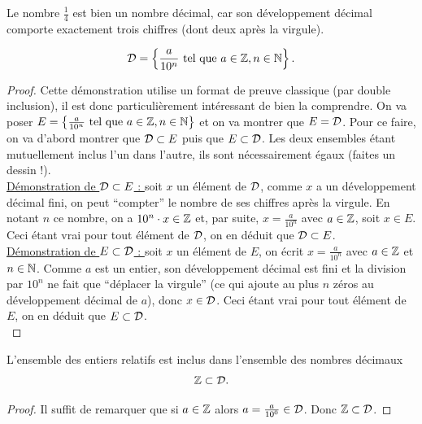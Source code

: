 \documentclass[a4paper, 12pt]{report}
\begin{document}
\begin{ex}
Le nombre $\frac{1}{4}$ est bien un nombre décimal, car son développement décimal comporte exactement trois chiffres (dont deux après la virgule).
\end{ex}

\begin{thm}
\[ \mathcal{D} = \left \{ \frac{a}{10^n} \text{ tel que } a \in \mathbb{Z}, n \in \mathbb{N} \right \} . \]
\end{thm}

\begin{proof}
Cette démonstration utilise un format de preuve classique (par double inclusion), il est donc particulièrement intéressant de bien la comprendre. On va poser $E = \left \{ \frac{a}{10^n} \text{ tel que } a \in \mathbb{Z}, n \in \mathbb{N} \right \}$ et on va montrer que $E = \mathcal{D}$. Pour ce faire, on va d'abord montrer que $\mathcal{D} \subset E$ puis que $E \subset \mathcal{D}$. Les deux ensembles étant mutuellement inclus l'un dans l'autre, ils sont nécessairement égaux (faites un dessin !). \\

\underline{Démonstration de $\mathcal{D} \subset E$ : } soit $x$ un élément de $\mathcal{D}$, comme $x$ a un développement décimal fini, on peut ``compter'' le nombre de ses chiffres après la virgule. En notant $n$ ce nombre, on a $10^n \cdot x \in \mathbb{Z}$ et, par suite, $x = \frac{a}{10^n}$ avec $a \in \mathbb{Z}$, soit $x \in E$. Ceci étant vrai pour tout élément de $\mathcal{D}$, on en déduit que $\mathcal{D} \subset E$. \\

\underline{Démonstration de $E \subset \mathcal{D}$ : } soit $x$ un élément de $E$, on écrit $x =  \frac{a}{10^n}$ avec $a \in \mathbb{Z}$ et $n \in \mathbb{N}$. Comme $a$ est un entier, son développement décimal est fini et la division par $10^n$ ne fait que ``déplacer la virgule'' (ce qui ajoute au plus $n$ zéros au développement décimal de $a$), donc $x \in \mathcal{D}$. Ceci étant vrai pour tout élément de $E$, on en déduit que $E \subset \mathcal{D}$. \\
\end{proof}

\begin{coro}
L'ensemble des entiers relatifs est inclus dans l'ensemble des nombres décimaux
\[ \mathbb{Z} \subset \mathcal{D}. \]
\end{coro}

\begin{proof}
Il suffit de remarquer que si $a \in \mathbb{Z}$ alors $a = \frac{a}{10^0} \in \mathcal{D}$. Donc $\mathbb{Z} \subset \mathcal{D}$.
\end{proof}
\end{document}

